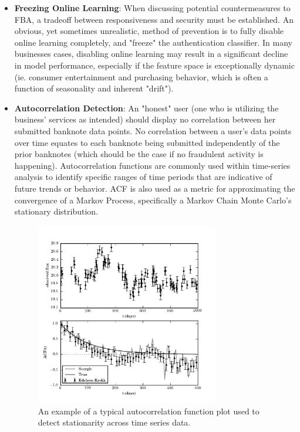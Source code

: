 \documentclass{article}
\begin{document}
\begin{itemize}
  \item \textbf{Freezing Online Learning}: When discussing potential countermeasures to FBA, a tradeoff between responsiveness and security must be established. An obvious, yet sometimes unrealistic, method of prevention is to fully disable online learning completely, and "freeze" the authentication classifier. In many businesses cases, disabling online learning may result in a significant decline in model performance, especially if the feature space is exceptionally dynamic (ie. consumer entertainment and purchasing behavior, which is often a function of seasonality and inherent "drift").
  \item \textbf{Autocorrelation Detection}: An "honest" user (one who is utilizing the business' services as intended) should display no correlation between her submitted banknote data points. No correlation between a user's data points over time equates to each banknote being submitted independently of the prior banknotes (which should be the case if no fraudulent activity is happening).
  \newline\newline
  Autocorrelation functions are commonly used within time-series analysis to identify specific ranges of time periods that are indicative of future trends or behavior. ACF is also used as a metric for approximating the convergence of a Markov Process, specifically a Markov Chain Monte Carlo's stationary distribution\cite{mcmc}.
  
  \begin{figure}
  \centering
\includegraphics[width=80mm]{acf.png}
  \caption{An example of a typical autocorrelation function plot used to detect stationarity across time series data.}
\end{figure}


\end{itemize}
\end{document}
